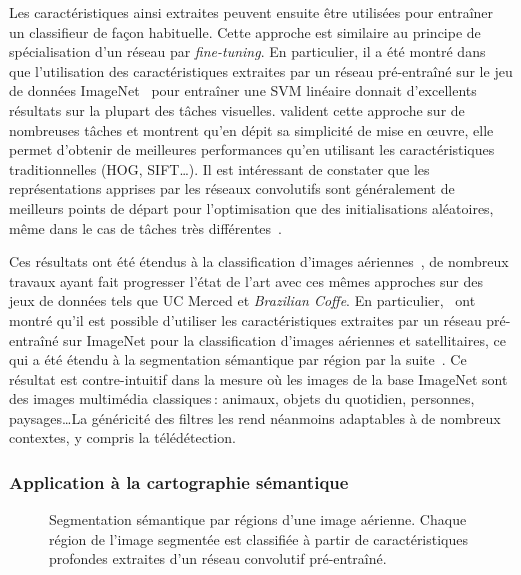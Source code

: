 Les caractéristiques ainsi extraites peuvent ensuite être utilisées pour entraîner un classifieur de façon habituelle. Cette approche est similaire au principe de spécialisation d'un réseau par \emph{fine-tuning}. En particulier, il a été montré dans~\cite{razavian_cnn_2014} que l'utilisation des caractéristiques extraites par un réseau pré-entraîné sur le jeu de données ImageNet~\cite{deng_imagenet_2009} pour entraîner une \gls{SVM} linéaire donnait d'excellents résultats sur la plupart des tâches visuelles. \citet{razavian_cnn_2014} valident cette approche sur de nombreuses tâches et montrent qu'en dépit sa simplicité de mise en \oe{}uvre, elle permet d'obtenir de meilleures performances qu'en utilisant les caractéristiques traditionnelles (\gls{HOG}, \gls{SIFT}\dots). Il est intéressant de constater que les représentations apprises par les réseaux convolutifs sont généralement de meilleurs points de départ pour l'optimisation que des initialisations aléatoires, même dans le cas de tâches très différentes~\cite{yosinski_how_2014}.

Ces résultats ont été étendus à la classification d'images aériennes~\cite{penatti_deep_2015,marmanis_deep_2016,lagrange_benchmarking_2015}, de nombreux travaux ayant fait progresser l'état de l'art avec ces mêmes approches sur des jeux de données tels que UC Merced et \emph{Brazilian Coffe}. En particulier,~\citet{marmanis_deep_2016,penatti_deep_2015} ont montré  qu'il est possible d'utiliser les caractéristiques extraites par un réseau pré-entraîné sur ImageNet pour la classification d'images aériennes et satellitaires, ce qui a été étendu à la segmentation sémantique par région par la suite~\cite{lagrange_benchmarking_2015}. Ce résultat est contre-intuitif dans la mesure où les images de la base ImageNet sont des images multimédia classiques\,: animaux, objets du quotidien, personnes, paysages\dots La généricité des filtres les rend néanmoins adaptables à de nombreux contextes, y compris la télédétection.

\subsubsection{Application à la cartographie sémantique}

\begin{figure}
\resizebox{\textwidth}{!}{%

}
\caption{Segmentation sémantique par régions d'une image aérienne. Chaque région de l'image segmentée est classifiée à partir de caractéristiques profondes extraites d'un réseau convolutif pré-entraîné.}
\label{fig:framework}
\end{figure}

